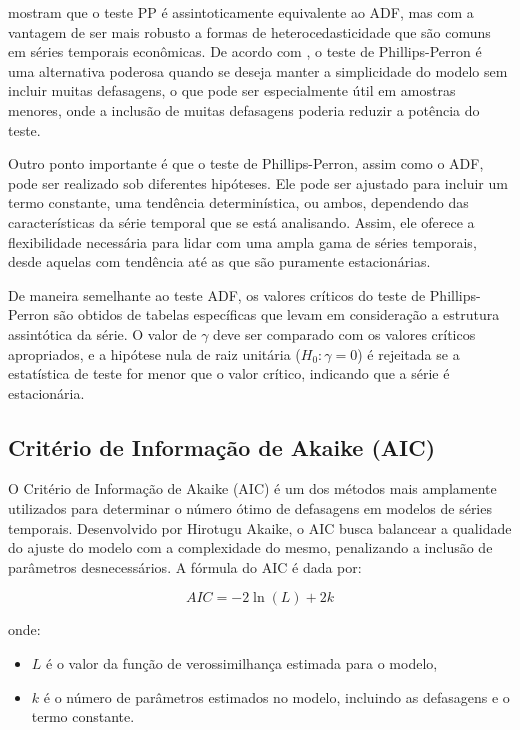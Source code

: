 \documentclass[12pt,oneside,a4paper,chapter=TITLE,english,brazil,sumario=abnt-6027-2012]{abntex2}
\begin{document}
 mostram que o teste PP é assintoticamente equivalente ao ADF, mas com a vantagem de ser mais robusto a formas de heterocedasticidade que são comuns em séries temporais econômicas. De acordo com , o teste de Phillips-Perron é uma alternativa poderosa quando se deseja manter a simplicidade do modelo sem incluir muitas defasagens, o que pode ser especialmente útil em amostras menores, onde a inclusão de muitas defasagens poderia reduzir a potência do teste.

Outro ponto importante é que o teste de Phillips-Perron, assim como o ADF, pode ser realizado sob diferentes hipóteses. Ele pode ser ajustado para incluir um termo constante, uma tendência determinística, ou ambos, dependendo das características da série temporal que se está analisando. Assim, ele oferece a flexibilidade necessária para lidar com uma ampla gama de séries temporais, desde aquelas com tendência até as que são puramente estacionárias.

De maneira semelhante ao teste ADF, os valores críticos do teste de Phillips-Perron são obtidos de tabelas específicas que levam em consideração a estrutura assintótica da série. O valor de \( \gamma \) deve ser comparado com os valores críticos apropriados, e a hipótese nula de raiz unitária (\( H_0: \gamma = 0 \)) é rejeitada se a estatística de teste for menor que o valor crítico, indicando que a série é estacionária.


\subsection{Critério de Informação de Akaike (AIC)}

O Critério de Informação de Akaike (AIC) é um dos métodos mais amplamente utilizados para determinar o número ótimo de defasagens em modelos de séries temporais. Desenvolvido por Hirotugu Akaike, o AIC busca balancear a qualidade do ajuste do modelo com a complexidade do mesmo, penalizando a inclusão de parâmetros desnecessários. A fórmula do AIC é dada por:

\[
	AIC = -2 \ln(L) + 2k
\]

onde:

\begin{itemize}
	\item \( L \) é o valor da função de verossimilhança estimada para o modelo,
	\item \( k \) é o número de parâmetros estimados no modelo, incluindo as defasagens e o termo constante.
\end{itemize}
\end{document}
